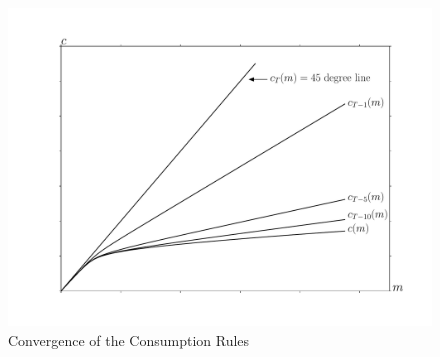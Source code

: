 \begin{figure}[tbp]
\centerline{\includegraphics[width=5.25in]{Figures/cFuncsConverge}}
\caption{Convergence of the Consumption Rules}
\label{fig:cFuncsConverge}
\end{figure}
